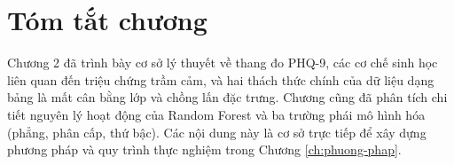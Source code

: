 \section{Tóm tắt chương}
\label{sec:tom-tat-chuong-2}

Chương 2 đã trình bày cơ sở lý thuyết về thang đo PHQ-9, các cơ chế sinh học liên quan đến triệu chứng trầm cảm, và hai thách thức chính của dữ liệu dạng bảng là mất cân bằng lớp và chồng lấn đặc trưng. Chương cũng đã phân tích chi tiết nguyên lý hoạt động của Random Forest và ba trường phái mô hình hóa (phẳng, phân cấp, thứ bậc). Các nội dung này là cơ sở trực tiếp để xây dựng phương pháp và quy trình thực nghiệm trong Chương \ref{ch:phuong-phap}.
